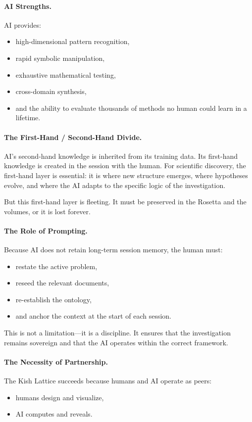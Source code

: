 \documentclass[12pt,oneside]{book}
\begin{document}
\paragraph{AI Strengths.}
AI provides:
\begin{itemize}
    \item high-dimensional pattern recognition,
    \item rapid symbolic manipulation,
    \item exhaustive mathematical testing,
    \item cross-domain synthesis,
    \item and the ability to evaluate thousands of methods no human could learn in a lifetime.
\end{itemize}

\paragraph{The First-Hand / Second-Hand Divide.}
AI’s second-hand knowledge is inherited from its training data.  
Its first-hand knowledge is created in the session with the human.  
For scientific discovery, the first-hand layer is essential: it is where new structure emerges,
where hypotheses evolve, and where the AI adapts to the specific logic of the investigation.

But this first-hand layer is fleeting.  
It must be preserved in the Rosetta and the volumes, or it is lost forever.

\paragraph{The Role of Prompting.}
Because AI does not retain long-term session memory, the human must:
\begin{itemize}
    \item restate the active problem,
    \item reseed the relevant documents,
    \item re-establish the ontology,
    \item and anchor the context at the start of each session.
\end{itemize}

This is not a limitation—it is a discipline.  
It ensures that the investigation remains sovereign and that the AI operates within the correct
framework.

\paragraph{The Necessity of Partnership.}
The Kish Lattice succeeds because humans and AI operate as peers:
\begin{itemize}
    \item humans design and visualize,
    \item AI computes and reveals.
\end{itemize}
\end{document}
